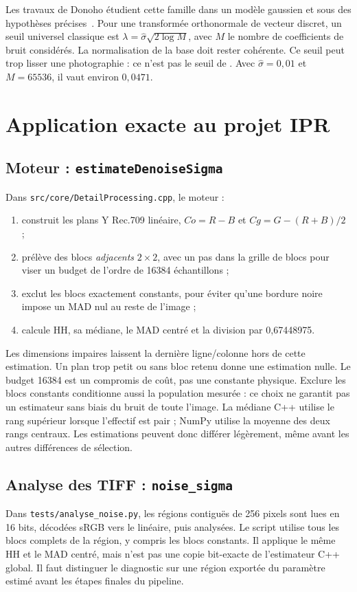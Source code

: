 Les travaux de Donoho étudient cette famille dans un modèle gaussien
et sous des hypothèses précises~\cite{donohoSoft}. Pour une transformée
orthonormale de vecteur discret, un seuil universel classique est
$\lambda=\widehat\sigma\sqrt{2\log M}$, avec $M$ le nombre de coefficients
de bruit considérés. La normalisation de la base doit rester cohérente.
Ce seuil peut trop lisser une photographie : ce n'est pas le seuil de \IPR{}.
Avec $\widehat\sigma=0{,}01$ et $M=65536$, il vaut environ $0{,}0471$.

\section{Application exacte au projet IPR}
\subsection{Moteur : \texttt{estimateDenoiseSigma}}
Dans \texttt{src/core/DetailProcessing.cpp}, le moteur :
\begin{enumerate}
\item construit les plans Y Rec.709 linéaire, $Co=R-B$ et $Cg=G-(R+B)/2$ ;
\item prélève des blocs \emph{adjacents} $2\times2$, avec un pas dans la grille
de blocs pour viser un budget de l'ordre de 16384 échantillons ;
\item exclut les blocs exactement constants, pour éviter qu'une bordure noire
impose un MAD nul au reste de l'image ;
\item calcule HH, sa médiane, le MAD centré et la division par 0,67448975.
\end{enumerate}
Les dimensions impaires laissent la dernière ligne/colonne hors de cette
estimation. Un plan trop petit ou sans bloc retenu donne une estimation nulle.
Le budget 16384 est un compromis de coût, pas une constante physique.
Exclure les blocs constants conditionne aussi la population mesurée :
ce choix ne garantit pas un estimateur sans biais du bruit de toute l'image.
La médiane C++ utilise le rang supérieur lorsque l'effectif est pair ;
NumPy utilise la moyenne des deux rangs centraux. Les estimations peuvent
donc différer légèrement, même avant les autres différences de sélection.

\subsection{Analyse des TIFF : \texttt{noise\_sigma}}
Dans \texttt{tests/analyse\_noise.py}, les régions contiguës de 256 pixels
sont lues en 16 bits, décodées sRGB vers le linéaire, puis analysées.
Le script utilise tous les blocs complets de la région, y compris les blocs
constants. Il applique le même HH et le MAD centré, mais n'est pas une copie
bit-exacte de l'estimateur C++ global. Il faut distinguer le diagnostic sur
une région exportée du paramètre estimé avant les étapes finales du pipeline.


